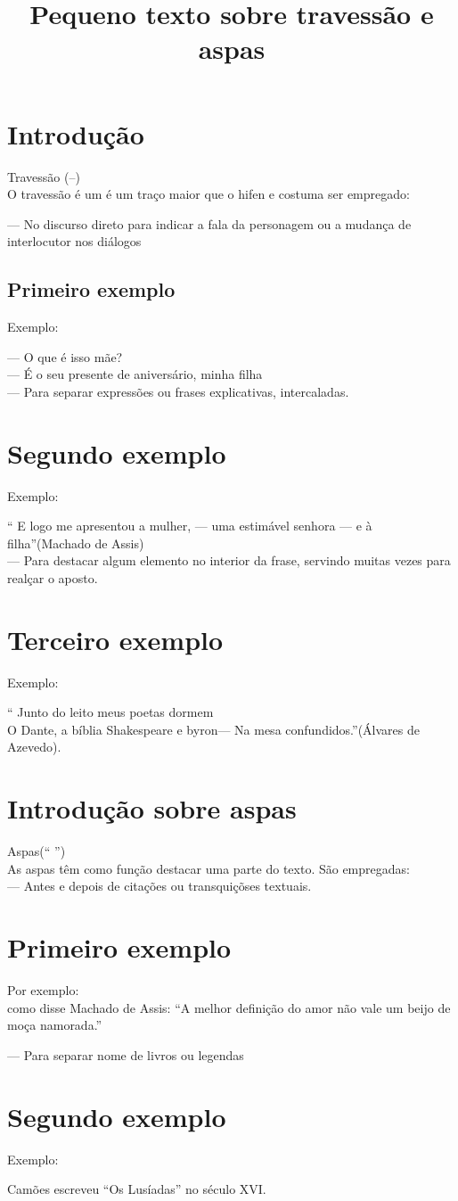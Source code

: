 \documentclass[12pt, article, oneside]{memoir}
\begin{document}
\title{ Pequeno texto sobre travessão e aspas}
\maketitle

\tableofcontents
\newpage
\chapter{Introdução}  




Travessão (--)\\
O travessão é um é um traço maior que o hifen e costuma ser empregado:

--- No discurso direto para indicar a fala da personagem ou a mudança de interlocutor nos diálogos
\section{Primeiro exemplo}

Exemplo:

--- O que é isso mãe?\\
--- É o seu presente de aniversário, minha filha\\
--- Para separar expressões ou frases explicativas, intercaladas.\\
\chapter{Segundo exemplo}
Exemplo:

`` E logo me apresentou a mulher, --- uma estimável senhora --- e à filha''(Machado de Assis)\\
--- Para destacar algum elemento no interior da frase, servindo muitas vezes para realçar o aposto.\\
\newpage
\chapter{Terceiro exemplo}
Exemplo:

`` Junto do leito meus poetas dormem\\
O Dante, a bíblia Shakespeare e byron--- \newline
Na mesa confundidos.''(Álvares de Azevedo).
\newpage
\chapter{Introdução sobre aspas}
Aspas(`` '')\\
As aspas têm como função destacar uma parte do texto. São empregadas:\\
--- Antes e depois de citações ou transquiçõses textuais.
\newpage
\chapter{Primeiro exemplo}
Por exemplo:\\
como disse Machado de Assis: ``A melhor definição do amor não vale um beijo de moça namorada.''

--- Para separar nome de livros ou legendas\\
\newpage
\chapter{Segundo exemplo}
Exemplo:

Camões escreveu ``Os Lusíadas'' no século XVI.
\end{document}
